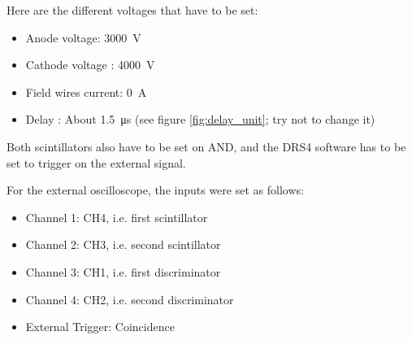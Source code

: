 \documentclass[12pt]{article}
\begin{document}
Here are the different voltages that have to be set:

\begin{itemize}
    \item Anode voltage: \SI{3000}{\volt}
    \item Cathode voltage : \SI{4000}{\volt}
    \item Field wires current: \SI{0}{A}
    \item Delay : About \SI{1.5}{\micro\second} (see figure \ref{fig:delay_unit}; try not to change it)
\end{itemize}

Both scintillators also have to be set on AND, and the DRS4 software has to be set to trigger on the external signal.

For the external oscilloscope, the inputs were set as follows:
\begin{itemize}
    \item Channel 1: CH4, i.e. first scintillator
    \item Channel 2: CH3, i.e. second scintillator
    \item Channel 3: CH1, i.e. first discriminator
    \item Channel 4: CH2, i.e. second discriminator
    \item External Trigger: Coincidence
\end{itemize}
\end{document}
